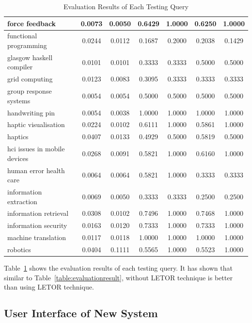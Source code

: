 \begin{table}
\begin{tabular}{|l|c|c|c|c|c|c|}
\hline force feedback & 0.0073 & 0.0050 & 0.6429 & 1.0000 & 0.6250 & 1.0000 \\
\hline functional programming & 0.0244 & 0.0112 & 0.1687 & 0.2000 & 0.2038 & 0.1429 \\
\hline glasgow haskell compiler & 0.0101 & 0.0101 & 0.3333 & 0.3333 & 0.5000 & 0.5000 \\
\hline grid computing & 0.0123 & 0.0083 & 0.3095 & 0.3333 & 0.3333 & 0.3333 \\
\hline group response systems & 0.0054 & 0.0054 & 0.5000 & 0.5000 & 0.5000 & 0.5000 \\
\hline handwriting pin & 0.0054 & 0.0038 & 1.0000 & 1.0000 & 1.0000 & 1.0000 \\
\hline haptic visualisation & 0.0224 & 0.0102 & 0.6111 & 1.0000 & 0.5861 & 1.0000 \\
\hline haptics & 0.0407 & 0.0133 & 0.4929 & 0.5000 & 0.5819 & 0.5000 \\
\hline hci issues in mobile devices & 0.0268 & 0.0091 & 0.5821 & 1.0000 & 0.6160 & 1.0000 \\
\hline human error health care & 0.0064 & 0.0064 & 0.5821 & 1.0000 & 0.3333 & 0.3333 \\
\hline information extraction & 0.0069 & 0.0050 & 0.3333 & 0.3333 & 0.2500 & 0.2500 \\
\hline information retrieval & 0.0308 & 0.0102 & 0.7496 & 1.0000 & 0.7468 & 1.0000 \\
\hline information security & 0.0163 & 0.0120 & 0.7333 & 1.0000 & 0.7333 & 1.0000 \\
\hline machine translation & 0.0117 & 0.0118 & 1.0000 & 1.0000 & 1.0000 & 1.0000 \\
\hline robotics & 0.0404 & 0.1111 & 0.5565 & 1.0000 & 0.5523 & 1.0000\\
\hline

\end{tabular}
\caption{Evaluation Results of Each Testing Query} \label{table:eachqueryevaluationresult}
\end{table}

Table~\ref{table:eachqueryevaluationresult} shows the evaluation results of each testing query. It has shown that similar to Table~\ref{table:evaluationresult},
without LETOR technique is better than using LETOR technique.

\subsection{User Interface of New System}

